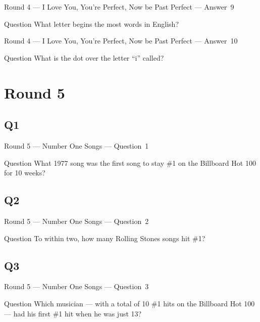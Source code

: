 \documentclass[11pt]{beamer}
\begin{document}
\begin{frame}[t]{Round 4 --- I Love You, You're Perfect, Now be Past Perfect --- \mbox{Answer 9}}
\vspace{-0.5em}
\begin{block}{Question}
What letter begins the most words in English?
\end{block}
\end{frame}
\begin{frame}[t]{Round 4 --- I Love You, You're Perfect, Now be Past Perfect --- \mbox{Answer 10}}
\vspace{-0.5em}
\begin{block}{Question}
What is the dot over the letter ``i'' called?
\end{block}
\end{frame}
\def\thisSectionName{Number One Songs}
\section{Round 5}
\subsection*{Q1}
\begin{frame}[t]{Round 5 --- Number One Songs --- \mbox{Question 1}}
\vspace{-0.5em}
\begin{block}{Question}
What 1977 song was the first song to stay \#1 on the Billboard Hot 100 for 10 weeks?
\end{block}
\end{frame}
\subsection*{Q2}
\begin{frame}[t]{Round 5 --- Number One Songs --- \mbox{Question 2}}
\vspace{-0.5em}
\begin{block}{Question}
To within two, how many Rolling Stones songs hit \#1?
\end{block}
\end{frame}
\subsection*{Q3}
\begin{frame}[t]{Round 5 --- Number One Songs --- \mbox{Question 3}}
\vspace{-0.5em}
\begin{block}{Question}
Which musician --- with a total of 10 \#1 hits on the Billboard Hot 100 --- had his first \#1 hit when he was just 13?
\end{block}
\end{frame}
\end{document}
